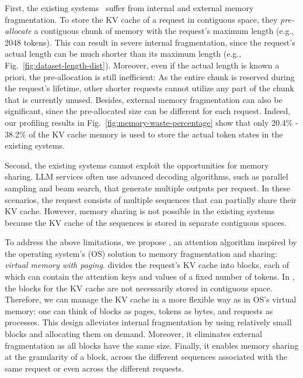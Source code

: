 First, the existing systems~\cite{yu2022orca,nvidiaft} suffer from internal and external memory fragmentation.
To store the KV cache of a request in contiguous space, they \emph{pre-allocate} a contiguous chunk of memory with the request's maximum length (e.g., 2048 tokens).
This can result in severe internal fragmentation, since the request's actual length can be much shorter than its maximum length (e.g., Fig.~\ref{fig:dataset-length-dist}).
Moreover, even if the actual length is known a priori, the pre-allocation is still inefficient: As the entire chunk is reserved during the request's lifetime, other shorter requests cannot utilize any part of the chunk that is currently unused.
Besides, external memory fragmentation can also be significant, since the pre-allocated size can be different for each request.
Indeed, our profiling results in Fig.~\ref{fig:memory-waste-percentage} show that only 20.4\% - 38.2\% of the KV cache memory is used to store the actual token states in the existing systems.

Second, the existing systems cannot exploit the opportunities for memory sharing.
LLM services often use advanced decoding algorithms, such as parallel sampling and beam search, that generate multiple outputs per request.
In these scenarios, the request consists of multiple sequences that can partially share their KV cache.
However, memory sharing is not possible in the existing systems because the KV cache of the sequences is stored in separate contiguous spaces.

To address the above limitations, we propose \emph{\tech}, an attention algorithm inspired by the operating system's (OS) solution to memory fragmentation and sharing: \emph{virtual memory with paging}.
\tech divides the request's KV cache into blocks, each of which can contain the attention keys and values of a fixed number of tokens.
In \tech, the blocks for the KV cache are not necessarily stored in contiguous space.
Therefore, we can manage the KV cache in a more flexible way as in OS’s virtual memory: one can think of blocks as pages, tokens as bytes, and requests as processes.
This design alleviates internal fragmentation by using relatively small blocks and allocating them on demand.
Moreover, it eliminates external fragmentation as all blocks have the same size.
Finally, it enables memory sharing at the granularity of a block, across the different sequences associated with the same request or even across the different requests.

